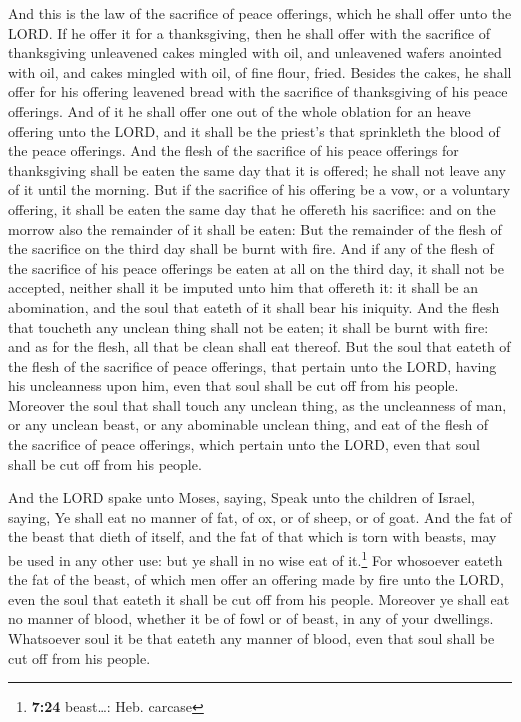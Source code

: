  And this is the law of the sacrifice of peace offerings,
which he shall offer unto the LORD.  If he offer it for a
thanksgiving, then he shall offer with the sacrifice of thanksgiving
unleavened cakes mingled with oil, and unleavened wafers anointed with
oil, and cakes mingled with oil, of fine flour, fried. 
Besides the cakes, he shall offer for his offering leavened bread with
the sacrifice of thanksgiving of his peace offerings. 
And of it he shall offer one out of the whole oblation for an heave
offering unto the LORD, and it shall be the priest's that sprinkleth the
blood of the peace offerings.  And the flesh of the
sacrifice of his peace offerings for thanksgiving shall be eaten the
same day that it is offered; he shall not leave any of it until the
morning.  But if the sacrifice of his offering be a vow,
or a voluntary offering, it shall be eaten the same day that he offereth
his sacrifice: and on the morrow also the remainder of it shall be
eaten:  But the remainder of the flesh of the sacrifice
on the third day shall be burnt with fire.  And if any of
the flesh of the sacrifice of his peace offerings be eaten at all on the
third day, it shall not be accepted, neither shall it be imputed unto
him that offereth it: it shall be an abomination, and the soul that
eateth of it shall bear his iniquity.  And the flesh that
toucheth any unclean thing shall not be eaten; it shall be burnt with
fire: and as for the flesh, all that be clean shall eat thereof.
 But the soul that eateth of the flesh of the sacrifice
of peace offerings, that pertain unto the LORD, having his uncleanness
upon him, even that soul shall be cut off from his people.
 Moreover the soul that shall touch any unclean thing, as
the uncleanness of man, or any unclean beast, or any abominable unclean
thing, and eat of the flesh of the sacrifice of peace offerings, which
pertain unto the LORD, even that soul shall be cut off from his people.

 And the LORD spake unto Moses, saying, 
Speak unto the children of Israel, saying, Ye shall eat no manner of
fat, of ox, or of sheep, or of goat.  And the fat of the
beast that dieth of itself, and the fat of that which is torn with
beasts, may be used in any other use: but ye shall in no wise eat of
it.\footnote{\textbf{7:24} beast\ldots: Heb. carcase} 
For whosoever eateth the fat of the beast, of which men offer an
offering made by fire unto the LORD, even the soul that eateth it shall
be cut off from his people.  Moreover ye shall eat no
manner of blood, whether it be of fowl or of beast, in any of your
dwellings.  Whatsoever soul it be that eateth any manner
of blood, even that soul shall be cut off from his people.

